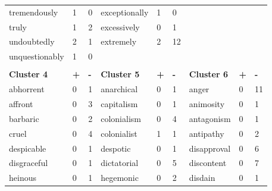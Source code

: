 \begin{table}
\begin{tabular}{lll|lll|lll}
tremendously       & 1          & 0          & exceptionally      & 1          & 0          &                                              &            &            \\
truly              & 1          & 2          & excessively        & 0          & 1          &                                              &            &            \\
undoubtedly        & 2          & 1          & extremely          & 2          & 12         &                                              &            &            \\
unquestionably     & 1          & 0          &                    &            &            &                                              &            &            \\
                   &            &            &                    &            &            &                                              &            &            \\
\textbf{Cluster 4} & \textbf{+} & \textbf{-} & \textbf{Cluster 5} & \textbf{+} & \textbf{-} & \textbf{Cluster 6}                           & \textbf{+} & \textbf{-} \\ \hline
abhorrent          & 0          & 1          & anarchical         & 0          & 1          & anger                                        & 0          & 11         \\
affront            & 0          & 3          & capitalism         & 0          & 1          & animosity                                    & 0          & 1          \\
barbaric           & 0          & 2          & colonialism        & 0          & 4          & antagonism                                   & 0          & 1          \\
cruel              & 0          & 4          & colonialist        & 1          & 1          & antipathy                                    & 0          & 2          \\
despicable         & 0          & 1          & despotic           & 0          & 1          & disapproval                                  & 0          & 6          \\
disgraceful        & 0          & 1          & dictatorial        & 0          & 5          & discontent                                   & 0          & 7          \\
heinous            & 0          & 1          & hegemonic          & 0          & 2          & disdain                                      & 0          & 1          \\

\end{tabular}
\end{table}
